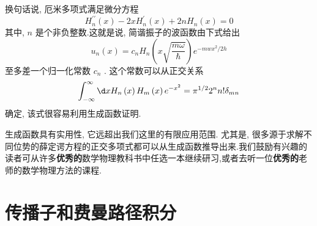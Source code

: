 换句话说, 厄米多项式满足微分方程
\begin{equation}
{H}_{n}^{\prime \prime }\left( x\right) - {2x}{H}_{n}^{\prime }\left( x\right) + {2n}{H}_{n}\left( x\right) = 0
\end{equation}
其中, $n$ 是个非负整数.这就是说, 简谐振子的波函数由下式给出
\begin{equation}
{u}_{n}\left( x\right) = {c}_{n}{H}_{n}\left( {x\sqrt{\frac{m\omega }{\hbar }}}\right) {e}^{-{mw}{x}^{2}/{2h}}
\end{equation}
至多差一个归一化常数 ${c}_{n}$ . 这个常数可以从正交关系
\begin{equation}
\int_{-\infty }^{\infty }{\d x}{H}_{n}\left( x\right) {H}_{m}\left( x\right) {e}^{-{x}^{2}} = {\pi }^{1/2}{2}^{n}n!{\delta }_{mn}
\end{equation}
确定, 该式很容易利用生成函数证明.

生成函数具有实用性, 它远超出我们这里的有限应用范围. 尤其是, 很多源于求解不同位势的薛定谔方程的正交多项式都可以从生成函数推导出来.我们鼓励有兴趣的读者可从许多\textbf{优秀的}数学物理教科书中任选一本继续研习,或者去听一位\textbf{优秀的}老师的数学物理方法的课程.

\section{传播子和费曼路径积分}
